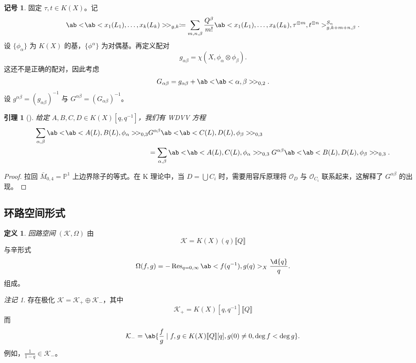 \documentclass{amsart}
\newtheorem{lem}[thm]{引理}
\theoremstyle{definition}
\newtheorem{defn}[thm]{定义}
\newtheorem{notn}[thm]{记号}
\theoremstyle{remark}
\newtheorem{rmk}[thm]{注记}
\theoremstyle{plain}
\theoremstyle{definition}
\theoremstyle{remark}
\renewcommand{\P}{\mathbb{P}}
\newcommand{\mc}[1]{\mathcal{#1}}
\newcommand{\on}[1]{\operatorname{#1}}
\newcommand{\1}{\mathbf{1}}
\newcommand{\2}{\mathbf{2}}
\newcommand{\3}{\mathbf{3}}
\newcommand{\ps}[1]{\llbracket #1 \rrbracket}
\begin{document}
\begin{notn}
    固定 \(\tau, t \in K(X)\)。记
    \[ \ab<\!\ab<x_1(L_1), \ldots, x_k(L_k)>\!>_{g,k} \coloneqq \sum_{m,n,\beta} \frac{Q^{\beta}}{m!} \ab<x_1(L_1), \ldots, x_k(L_k), \tau^{\otimes m}, t^{\otimes n}>_{g,k+m+n,\beta}^{S_n}. \]
    设 \(\{\phi_{\alpha}\}\) 为 \(K(X)\) 的基，\(\{\phi^{\alpha}\}\) 为对偶基。再定义配对
    \[ g_{\alpha\beta} = \chi(X, \phi_{\alpha} \otimes \phi_{\beta}). \]
    这还不是正确的配对，因此考虑
    \[ G_{\alpha\beta} = g_{\alpha\beta} + \ab<\!\ab<\alpha,\beta>\!>_{0,2}. \]
    设 \(g^{\alpha\beta} = (g_{\alpha\beta})^{-1}\) 与 \(G^{\alpha\beta} = (G_{\alpha\beta})^{-1}\)。
\end{notn}

\begin{lem}[{\cite{Givental2000K}}]
    给定 \(A,B,C,D \in K(X)[q,q^{-1}]\)，我们有 \textit{WDVV 方程}
    \begin{align*}
        \sum_{\alpha,\beta} \ab<\!\ab< A(L), B(L), \phi_{\alpha}>\! >_{0,3}& G^{\alpha\beta}\ab<\!\ab< C(L), D(L), \phi_{\beta}>\! >_{0,3} \\
        &= \sum_{\alpha,\beta} \ab<\!\ab< A(L), C(L), \phi_{\alpha}>\! >_{0,3} G^{\alpha\beta}\ab<\!\ab< B(L), D(L), \phi_{\beta}>\! >_{0,3}.
    \end{align*}
\end{lem}

\begin{proof}
    拉回 \(\bar{M}_{0,4} = \P^1\) 上边界除子的等式。在 K 理论中，当 \(D = \bigcup C_i\) 时，需要用容斥原理将 \(\mc{O}_D\) 与 \(\mc{O}_{C_i}\) 联系起来，这解释了 \(G^{\alpha\beta}\) 的出现。
\end{proof}

\subsection{环路空间形式}%
\label{sub:Loop space formalism}

\begin{defn}
    \textit{回路空间} \((\mc{K}, \Omega)\) 由
    \[ \mc{K} = K(X)(q) \ps{Q}\]
    与辛形式
    \[ \Omega(f, g) = - \on{Res}_{q = 0, \infty} \ab<f(q^{-1}), g(q)>_X \frac{\d{q}}{q}. \]
    组成。
\end{defn}

\begin{rmk}
    存在极化 \(\mc{K} = \mc{K}_+ \oplus \mc{K}_-\)，其中
    \[ \mc{K}_+ = K(X)[q, q^{-1}]\ps{Q} \]
    而
    \[ \mc{K}_- = \ab\{ \frac{f}{g} \mid f, g \in K(X)\ps{Q}[q], g(0) \neq 0, \deg f < \deg g\}. \]
    例如，\(\frac{1}{1-q} \in \mc{K}_-\)。
\end{rmk}
\end{document}
